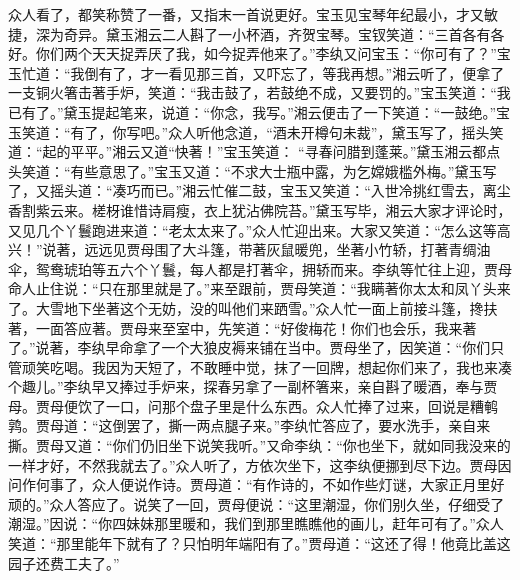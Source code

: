 \begin{parag}
    众人看了，都笑称赞了一番，又指末一首说更好。宝玉见宝琴年纪最小，才又敏捷，深为奇异。黛玉湘云二人斟了一小杯酒，齐贺宝琴。宝钗笑道：“三首各有各好。你们两个天天捉弄厌了我，如今捉弄他来了。”李纨又问宝玉：“你可有了？”宝玉忙道：“我倒有了，才一看见那三首，又吓忘了，等我再想。”湘云听了，便拿了一支铜火箸击著手炉，笑道：“我击鼓了，若鼓绝不成，又要罚的。”宝玉笑道：“我已有了。”黛玉提起笔来，说道：“你念，我写。”湘云便击了一下笑道：“一鼓绝。”宝玉笑道：“有了，你写吧。”众人听他念道，“酒未开樽句未裁”，黛玉写了，摇头笑道：“起的平平。”湘云又道“快著！”宝玉笑道： “寻春问腊到蓬莱。”黛玉湘云都点头笑道：“有些意思了。”宝玉又道：“不求大士瓶中露，为乞嫦娥槛外梅。”黛玉写了，又摇头道：“凑巧而已。”湘云忙催二鼓，宝玉又笑道：“入世冷挑红雪去，离尘香割紫云来。槎枒谁惜诗肩瘦，衣上犹沾佛院苔。”黛玉写毕，湘云大家才评论时，又见几个丫鬟跑进来道：“老太太来了。”众人忙迎出来。大家又笑道：“怎么这等高兴！”说著，远远见贾母围了大斗篷，带著灰鼠暖兜，坐著小竹轿，打著青绸油伞，鸳鸯琥珀等五六个丫鬟，每人都是打著伞，拥轿而来。李纨等忙往上迎，贾母命人止住说：“只在那里就是了。”来至跟前，贾母笑道：“我瞒著你太太和凤丫头来了。大雪地下坐著这个无妨，没的叫他们来跴雪。”众人忙一面上前接斗篷，搀扶著，一面答应著。贾母来至室中，先笑道：“好俊梅花！你们也会乐，我来著了。”说著，李纨早命拿了一个大狼皮褥来铺在当中。贾母坐了，因笑道：“你们只管顽笑吃喝。我因为天短了，不敢睡中觉，抹了一回牌，想起你们来了，我也来凑个趣儿。”李纨早又捧过手炉来，探春另拿了一副杯箸来，亲自斟了暖酒，奉与贾母。贾母便饮了一口，问那个盘子里是什么东西。众人忙捧了过来，回说是糟鹌鹑。贾母道：“这倒罢了，撕一两点腿子来。”李纨忙答应了，要水洗手，亲自来撕。贾母又道：“你们仍旧坐下说笑我听。”又命李纨：“你也坐下，就如同我没来的一样才好，不然我就去了。”众人听了，方依次坐下，这李纨便挪到尽下边。贾母因问作何事了，众人便说作诗。贾母道：“有作诗的，不如作些灯谜，大家正月里好顽的。”众人答应了。说笑了一回，贾母便说：“这里潮湿，你们别久坐，仔细受了潮湿。”因说：“你四妹妹那里暖和，我们到那里瞧瞧他的画儿，赶年可有了。”众人笑道：“那里能年下就有了？只怕明年端阳有了。”贾母道：“这还了得！他竟比盖这园子还费工夫了。”
\end{parag}


